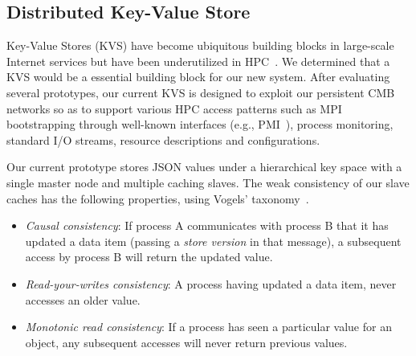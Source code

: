 \subsection{Distributed Key-Value Store}

Key-Value Stores (KVS) have become ubiquitous building blocks in large-scale
Internet services but have been underutilized in HPC~\cite{Wang:2013:USE:2503210.2503239}.
We determined that a KVS would be a
essential building block for our new system.
After evaluating several prototypes, our current KVS is designed
to exploit our persistent CMB networks so as to 
support various HPC access patterns such as
MPI bootstrapping through well-known interfaces (e.g., PMI~\cite{PMI2}),
process monitoring, standard I/O streams, resource descriptions and
configurations. 

%
%
Our current prototype stores JSON values under a hierarchical key space
with a single master node and multiple caching slaves.  The weak consistency
of our slave caches has the following properties, using Vogels'
taxonomy~\cite{Vogels:2009:EC:1435417.1435432}.

\begin{itemize}
\item{{\em Causal consistency}:  If process A communicates with process B
that it has updated a data item (passing a {\em store version} in that
message), a subsequent access by process B will return the updated value.}
\item{{\em Read-your-writes consistency}:  A process having updated a
data item, never accesses an older value.}
\item{{\em Monotonic read consistency}:  If a process has seen a particular
value for an object, any subsequent accesses will never return previous values.}
\end{itemize}

